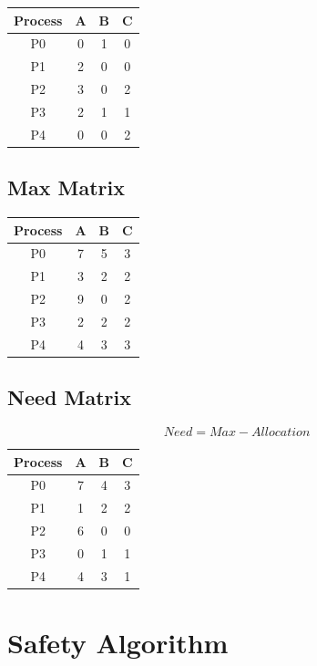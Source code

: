 \begin{center}
\begin{tabular}{cccc}
\toprule
Process & A & B & C\\
\midrule
P0 & 0 & 1 & 0\\
P1 & 2 & 0 & 0\\
P2 & 3 & 0 & 2\\
P3 & 2 & 1 & 1\\
P4 & 0 & 0 & 2\\
\bottomrule
\end{tabular}
\end{center}

\subsection{Max Matrix}

\begin{center}
\begin{tabular}{cccc}
\toprule
Process & A & B & C\\
\midrule
P0 & 7 & 5 & 3\\
P1 & 3 & 2 & 2\\
P2 & 9 & 0 & 2\\
P3 & 2 & 2 & 2\\
P4 & 4 & 3 & 3\\
\bottomrule
\end{tabular}
\end{center}

\subsection{Need Matrix}

\[
Need = Max - Allocation
\]

\begin{center}
\begin{tabular}{cccc}
\toprule
Process & A & B & C\\
\midrule
P0 & 7 & 4 & 3\\
P1 & 1 & 2 & 2\\
P2 & 6 & 0 & 0\\
P3 & 0 & 1 & 1\\
P4 & 4 & 3 & 1\\
\bottomrule
\end{tabular}
\end{center}

\section{Safety Algorithm}

